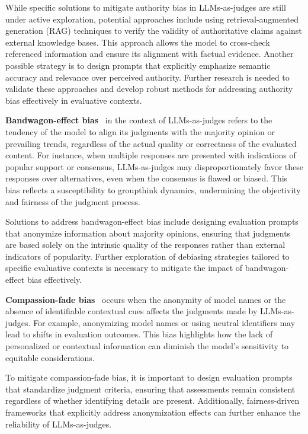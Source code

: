     While specific solutions to mitigate authority bias in LLMs-as-judges are still under active exploration, potential approaches include using retrieval-augmented generation (RAG) techniques to verify the validity of authoritative claims against external knowledge bases. This approach allows the model to cross-check referenced information and ensure its alignment with factual evidence. Another possible strategy is to design prompts that explicitly emphasize semantic accuracy and relevance over perceived authority. Further research is needed to validate these approaches and develop robust methods for addressing authority bias effectively in evaluative contexts.    

\noindent\textbf{Bandwagon-effect bias}~\cite{koo2023benchmarking,ye2024justice}  in the context of LLMs-as-judges refers to the tendency of the model to align its judgments with the majority opinion or prevailing trends, regardless of the actual quality or correctness of the evaluated content. For instance, when multiple responses are presented with indications of popular support or consensus, LLMs-as-judges may disproportionately favor these responses over alternatives, even when the consensus is flawed or biased. This bias reflects a susceptibility to groupthink dynamics, undermining the objectivity and fairness of the judgment process.

    Solutions to address bandwagon-effect bias include designing evaluation prompts that anonymize information about majority opinions, ensuring that judgments are based solely on the intrinsic quality of the responses rather than external indicators of popularity. Further exploration of debiasing strategies tailored to specific evaluative contexts is necessary to mitigate the impact of bandwagon-effect bias effectively.
    
    
\noindent\textbf{Compassion-fade bias}~\cite{koo2023benchmarking,ye2024justice} occurs when the anonymity of model names or the absence of identifiable contextual cues affects the judgments made by LLMs-as-judges. For example, anonymizing model names or using neutral identifiers may lead to shifts in evaluation outcomes. This bias highlights how the lack of personalized or contextual information can diminish the model’s sensitivity to equitable considerations.

    To mitigate compassion-fade bias, it is important to design evaluation prompts that standardize judgment criteria, ensuring that assessments remain consistent regardless of whether identifying details are present. Additionally, fairness-driven frameworks that explicitly address anonymization effects can further enhance the reliability of LLMs-as-judges.

